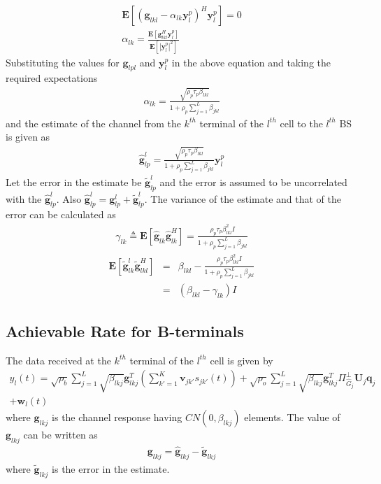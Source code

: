\documentclass[10pt, a4paper, twoside,fleqn]{article}
\begin{document}
\begin{eqnarray}
	\pmb{E}[(\pmb{g}_{lkl}-\alpha_{lk}\pmb{y}_{l}^{p})^H \pmb{y}_{l}^{p}] = 0 \\
	\alpha_{lk} = \frac{\pmb{E}[\pmb{g}^{H}_{lkl} \pmb{y}_{l}^{p}]}{\pmb{E}[|\pmb{y}_{l}^{p}|^2]}
\end{eqnarray}
Substituting the values for $\pmb{g}_{lpl}$ and $\pmb{y}_{l}^{p}$ in the above equation and taking the required expectations
\begin{eqnarray}\label{eq:alphapll}
	\alpha_{lk}=\frac{\sqrt{\rho_p \tau_p \beta_{lkl}}}{1+\rho_p\sum\limits_{j=1}^{L}\beta_{jkl}}
\end{eqnarray}
and the estimate of the channel from the $k^{th}$ terminal of the $l^{th}$ cell to the $l^{th}$ BS is given as
\begin{eqnarray}\label{eq:estimatehpll}
	\pmb{\hat g}_{lp}^{l} = \frac{\sqrt{\rho_p\tau_p\beta_{lkl}}}{1+\rho_p\sum\limits_{j=1}^{L}\beta_{jkl}} \pmb{y}_{l}^{p}
\end{eqnarray}
Let the error in the estimate be ${\pmb{\widetilde{g}}_{lp}^{l}}$ and the error is assumed to be uncorrelated with the $\pmb{\hat g}_{lp}^{l}$. Also $\pmb{\hat g}_{lp}^{l}=\pmb{g}_{lp}^{l}+\pmb{\widetilde{g}}_{lp}^{l}$.
The variance of the estimate and that of the error can be calculated as
\begin{eqnarray}
	\gamma_{lk} \triangleq \pmb{E}[\pmb{\hat g}_{lk}\pmb{\hat g}^H_{lk}]
                    =       \frac{\rho_p\tau_p\beta^2_{lkl}I}{1+\rho_p\sum\limits_{j=1}^{L}\beta_{jkl}} 
\end{eqnarray}
\begin{eqnarray}
    \pmb{E}[\pmb{\widetilde{g}}_{lk}^{l} \pmb{\widetilde{g}}^H_{lkl}] &=& \beta_{lkl}- \frac{\rho_p\tau_p\beta^2_{lkl}I}{1+\rho_p\sum\limits_{j=1}^{L}\beta_{jkl}} \nonumber\\
          									    &=& (\beta_{lkl} - \gamma_{lk})I
\end{eqnarray}

\subsection{Achievable Rate for B-terminals}

The data received at the $k^{th}$ terminal of the $l^{th}$ cell is given by
\begin{eqnarray}\label{eq:ot}
 	y_{l}(t) = \sqrt{\rho_b}\sum_{j=1}^{L} \sqrt{\beta_{lkj}} \pmb{g}_{lkj}^{T} \left(\sum_{k'=1}^{K}\pmb{v}_{jk'}s_{jk'}(t)\right)
 		      + \sqrt{\rho_o}\sum_{j=1}^{L}\sqrt{\beta_{lkj}}\pmb{g}^T_{lkj} \Pi^{\perp}_{{\widehat{G}_j}} \pmb{U}_j\pmb{q}_{j} \nonumber \\
 		      + \pmb{w}_{l}(t)
\end{eqnarray}  
where  $\pmb{g}_{lkj}$ is the channel response having $CN(0,\beta_{lkj})$ elements. The value of $\pmb{g}_{lkj}$ can be written as
\begin{eqnarray}\label{eqn:gvect}
 \pmb{g}_{lkj} =  \pmb{\hat g}_{lkj} - \pmb{\widetilde{g}}_{lkj}
\end{eqnarray}
where  $\pmb{\widetilde{g}}_{lkj}$ is the error in the estimate.
\end{document}
